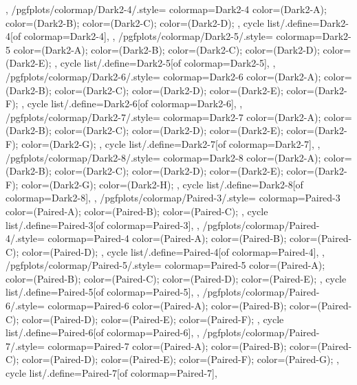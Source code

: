 {{  },
  /pgfplots/colormap/Dark2-4/.style={
    colormap={Dark2-4}{
      color=(Dark2-A);
      color=(Dark2-B);
      color=(Dark2-C);
      color=(Dark2-D);
    },
    cycle list/.define={Dark2-4}{[of colormap=Dark2-4]},
  },
  /pgfplots/colormap/Dark2-5/.style={
    colormap={Dark2-5}{
      color=(Dark2-A);
      color=(Dark2-B);
      color=(Dark2-C);
      color=(Dark2-D);
      color=(Dark2-E);
    },
    cycle list/.define={Dark2-5}{[of colormap=Dark2-5]},
  },
  /pgfplots/colormap/Dark2-6/.style={
    colormap={Dark2-6}{
      color=(Dark2-A);
      color=(Dark2-B);
      color=(Dark2-C);
      color=(Dark2-D);
      color=(Dark2-E);
      color=(Dark2-F);
    },
    cycle list/.define={Dark2-6}{[of colormap=Dark2-6]},
  },
  /pgfplots/colormap/Dark2-7/.style={
    colormap={Dark2-7}{
      color=(Dark2-A);
      color=(Dark2-B);
      color=(Dark2-C);
      color=(Dark2-D);
      color=(Dark2-E);
      color=(Dark2-F);
      color=(Dark2-G);
    },
    cycle list/.define={Dark2-7}{[of colormap=Dark2-7]},
  },
  /pgfplots/colormap/Dark2-8/.style={
    colormap={Dark2-8}{
      color=(Dark2-A);
      color=(Dark2-B);
      color=(Dark2-C);
      color=(Dark2-D);
      color=(Dark2-E);
      color=(Dark2-F);
      color=(Dark2-G);
      color=(Dark2-H);
    },
    cycle list/.define={Dark2-8}{[of colormap=Dark2-8]},
  },
  /pgfplots/colormap/Paired-3/.style={
    colormap={Paired-3}{
      color=(Paired-A);
      color=(Paired-B);
      color=(Paired-C);
    },
    cycle list/.define={Paired-3}{[of colormap=Paired-3]},
  },
  /pgfplots/colormap/Paired-4/.style={
    colormap={Paired-4}{
      color=(Paired-A);
      color=(Paired-B);
      color=(Paired-C);
      color=(Paired-D);
    },
    cycle list/.define={Paired-4}{[of colormap=Paired-4]},
  },
  /pgfplots/colormap/Paired-5/.style={
    colormap={Paired-5}{
      color=(Paired-A);
      color=(Paired-B);
      color=(Paired-C);
      color=(Paired-D);
      color=(Paired-E);
    },
    cycle list/.define={Paired-5}{[of colormap=Paired-5]},
  },
  /pgfplots/colormap/Paired-6/.style={
    colormap={Paired-6}{
      color=(Paired-A);
      color=(Paired-B);
      color=(Paired-C);
      color=(Paired-D);
      color=(Paired-E);
      color=(Paired-F);
    },
    cycle list/.define={Paired-6}{[of colormap=Paired-6]},
  },
  /pgfplots/colormap/Paired-7/.style={
    colormap={Paired-7}{
      color=(Paired-A);
      color=(Paired-B);
      color=(Paired-C);
      color=(Paired-D);
      color=(Paired-E);
      color=(Paired-F);
      color=(Paired-G);
    },
    cycle list/.define={Paired-7}{[of colormap=Paired-7]},
}}
